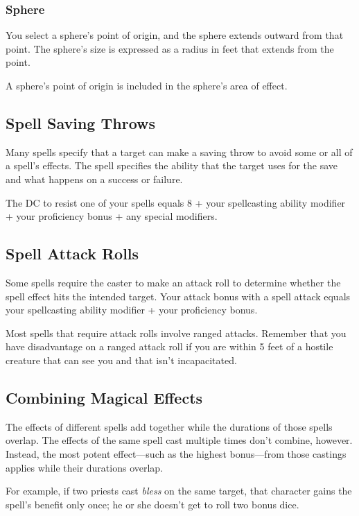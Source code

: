 \subsubsection{Sphere}

You select a sphere's point of origin, and the sphere extends outward from that point. The sphere's size is expressed as a radius in feet that extends from the point.

A sphere's point of origin is included in the sphere's area of effect.

\subsection{Spell Saving Throws}

Many spells specify that a target can make a saving throw to avoid some or all of a spell's effects. The spell specifies the ability that the target uses for the save and what happens on a success or failure.

The DC to resist one of your spells equals 8 + your spellcasting ability modifier + your proficiency bonus + any special modifiers.

\subsection{Spell Attack Rolls}

Some spells require the caster to make an attack roll to determine whether the spell effect hits the intended target. Your attack bonus with a spell attack equals your spellcasting ability modifier + your proficiency bonus.

Most spells that require attack rolls involve ranged attacks. Remember that you have disadvantage on a ranged attack roll if you are within 5 feet of a hostile creature that can see you and that isn't incapacitated.

\subsection{Combining Magical Effects}

The effects of different spells add together while the durations of those spells overlap. The effects of the same spell cast multiple times don't combine, however. Instead, the most potent effect—such as the highest bonus—from those castings applies while their durations overlap.

For example, if two priests cast \textit{bless} on the same target, that character gains the spell's benefit only once; he or she doesn't get to roll two bonus dice.


